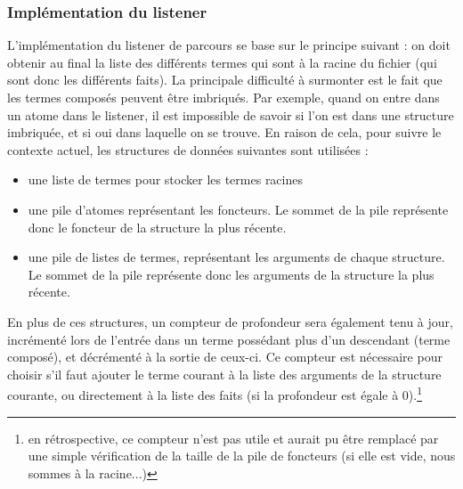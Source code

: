 \documentclass[../report.tex]{subfiles}
\begin{document}
\subsubsection{Implémentation du listener}
\label{subsubsec:listenerImpl}
L'implémentation du listener de parcours se base sur le principe suivant : on doit obtenir au final la liste des différents termes qui sont à la racine du fichier (qui sont donc les différents faits). La principale difficulté à surmonter est le fait que les termes composés peuvent être imbriqués. Par exemple, quand on entre dans un atome dans le listener, il est impossible de savoir si l'on est dans une structure imbriquée, et si oui dans laquelle on se trouve. En raison de cela, pour suivre le contexte actuel, les structures de données suivantes sont utilisées :
\begin{itemize}
    \item une liste de termes pour stocker les termes racines
    \item une pile d'atomes représentant les foncteurs. Le sommet de la pile représente donc le foncteur de la structure la plus récente.
    \item une pile de listes de termes, représentant les arguments de chaque structure. Le sommet de la pile représente donc les arguments de la structure la plus récente.
\end{itemize}
En plus de ces structures, un compteur de profondeur sera également tenu à jour, incrémenté lors de l'entrée dans un terme possédant plus d'un descendant (terme composé), et décrémenté à la sortie de ceux-ci. Ce compteur est nécessaire pour choisir s'il faut ajouter le terme courant à la liste des arguments de la structure courante, ou directement à la liste des faits (si la profondeur est égale à 0).\footnote{en rétrospective, ce compteur n'est pas utile et aurait pu être remplacé par une simple vérification de la taille de la pile de foncteurs (si elle est vide, nous sommes à la racine...)}
\end{document}
